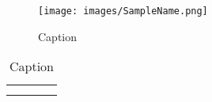 
\begin{figure}[H]
  \texttt{[image: images/SampleName.png]} 
  \caption[Content, Quelle: Autor]{Caption}
  \label{fig:ImageTag}
\end{figure}


\begin{table}[H]
  \centering
  \caption[Content, Quelle: Autor]{Caption}
      
  \label{tab:TableTag}
  \begin{tabular}{@{}l|lp{4.5cm}l@{}}
    \toprule
       & & \\ \midrule
       & & \\
       & & \\ \bottomrule
  \end{tabular}
\end{table}




\begin{equation}
  \begin{split}
  
  \end{split}
\end{equation}